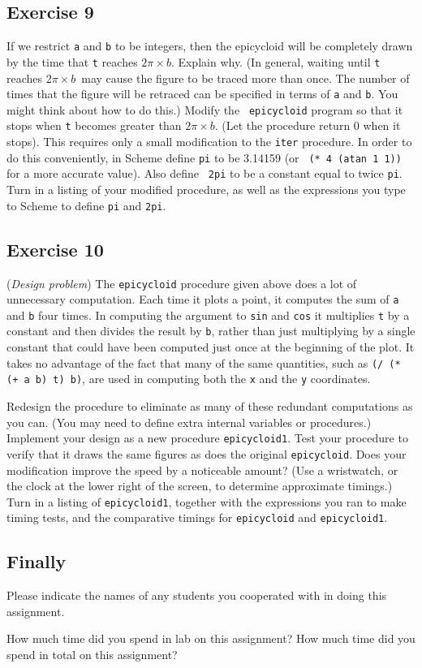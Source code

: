 \subsection{Exercise 9}

\newcommand{\twopib}{$2\pi\times b$}

If we restrict {\tt a} and {\tt b} to be integers, then the epicycloid
will be completely drawn by the time that {\tt t} reaches \twopib.
Explain why.  (In general, waiting until {\tt t} reaches \twopib\  may
cause the figure to be traced more than once.  The number of times
that the figure will be retraced can be specified in terms of {\tt a}
and {\tt b}.  You might think about how to do this.)  Modify the {\tt
epicycloid} program so that it stops when {\tt t} becomes greater than
\twopib.  (Let the procedure return 0 when it stops).  This requires
only a small modification to the {\tt iter} procedure.  In order to do
this conveniently, in Scheme define {\tt pi} to be 3.14159 (or \hbox{\tt
(* 4 (atan 1 1))} for a more accurate value).  Also define {\tt
2pi} to be a constant equal to twice {\tt pi}.  Turn in a listing of
your modified procedure, as well as the expressions you type to Scheme
to define {\tt pi} and {\tt 2pi}.

\subsection{Exercise 10}

({\it Design problem\/}) The {\tt epicycloid} procedure given above does a
lot of unnecessary computation.  Each time it plots a point, it
computes the sum of {\tt a} and {\tt b} four times.  In computing the
argument to {\tt sin} and {\tt cos} it multiplies {\tt t} by a constant and
then divides the result by {\tt b}, rather than just multiplying by a
single constant that could have been computed just once at the
beginning of the plot.  It takes no advantage of the fact that many of
the same quantities, such as \mbox{\tt (/ (* (+ a b) t) b)}, are used in
computing both the {\tt x} and the {\tt y} coordinates.

Redesign the procedure to eliminate as many of these redundant
computations as you can.  (You may need to define extra internal
variables or procedures.)  Implement your design as a new procedure
{\tt epicycloid1}.  Test your procedure to verify that it draws the same
figures as does the original {\tt epicycloid}.  Does your modification
improve the speed by a noticeable amount?  (Use a wristwatch, or the
clock at the lower right of the screen, to determine approximate
timings.)  Turn in a listing of {\tt epicycloid1}, together with the
expressions you ran to make timing tests, and the comparative timings
for {\tt epicycloid} and {\tt epicycloid1}.


\subsection{Finally}

Please indicate the names of any students you cooperated with in doing
this assignment.

How much time did you spend in lab on this assignment?  How much time
did you spend in total on this assignment?




